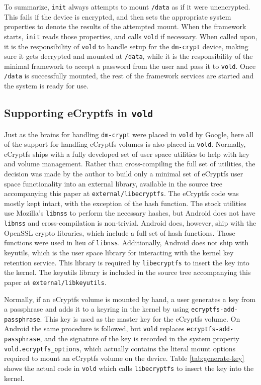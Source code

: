 To summarize, \texttt{init} always attempts to mount \texttt{/data} as if it were unencrypted. This fails if the device is
encrypted, and then sets the appropriate system properties to denote the results of the attempted mount. When the framework starts,
\texttt{init} reads those properties, and calls \texttt{vold} if necessary. When called upon, it is the responsibility of
\texttt{vold} to handle setup for the \texttt{dm-crypt} device, making sure it gets decrypted and mounted at \texttt{/data}, while it
is the responsibility of the minimal framework to accept a password from the user and pass it to \texttt{vold}. Once \texttt{/data}
is successfully mounted, the rest of the framework services are started and the system is ready for use.

\subsection{Supporting eCryptfs in \texttt{vold}} \label{sec:ecryptfsvold} Just as the brains for handling \texttt{dm-crypt} were
placed in \texttt{vold} by Google, here all of the support for handling eCryptfs volumes is also placed in \texttt{vold}. Normally,
eCryptfs ships with a fully developed set of user space utilities to help with key and volume management. Rather than cross-compiling
the full set of utilities, the decision was made by the author to build only a minimal set of eCryptfs user space functionality into
an external library, available in the source tree accompanying this paper at \texttt{external/libecryptfs}.  The eCryptfs code was
mostly kept intact, with the exception of the hash function. The stock utilities use Mozilla's \texttt{libnss} to perform the
necessary hashes, but Android does not have \texttt{libnss} and cross-compilation is non-trivial. Android does, however, ship with
the OpenSSL crypto libraries, which include a full set of hash functions. Those functions were used in lieu of \texttt{libnss}.
Additionally, Android does not ship with keyutils, which is the user space library for interacting with the kernel key retention
service.  This library is required by \texttt{libecryptfs} to insert the key into the kernel. The keyutils library is included in
the source tree accompanying this paper at \texttt{external/libkeyutils}. 

Normally, if an eCryptfs volume is mounted by hand, a user generates a key from a passphrase and adds it to a keyring in the kernel
by using \texttt{ecryptfs-add-passphrase}.  This key is used as the master key for the eCryptfs volume. On Android the same
procedure is followed, but \texttt{vold} replaces \texttt{ecryptfs-add-passphrase}, and the signature of the key is recorded in the
system property \texttt{vold.ecryptfs\_options}, which actually contains the literal mount options required to mount an eCryptfs
volume on the device. Table \ref{tab:generate-key} shows the actual code in \texttt{vold} which calls \texttt{libecryptfs} to insert
the key into the kernel. 

